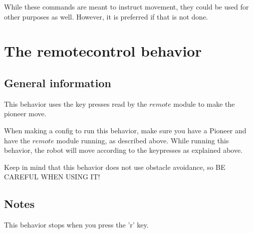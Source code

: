\documentclass[a4paper, 12pt, oneside]{report}
\begin{document}
While these commands are meant to instruct movement, they could be used for other purposes as well. However, it is preferred if that is not done.

\chapter{The remotecontrol behavior}

\section{General information}

This behavior uses the key presses read by the $remote$ module to make the pioneer move.

When making a config to run this behavior, make sure you have a Pioneer and have the $remote$ module running, as described above.
While running this behavior, the robot will move according to the keypresses as explained above.

Keep in mind that this behavior does not use obstacle avoidance, so BE CAREFUL WHEN USING IT!

\section{Notes}

This behavior stops when you press the 'r' key.
\end{document}
